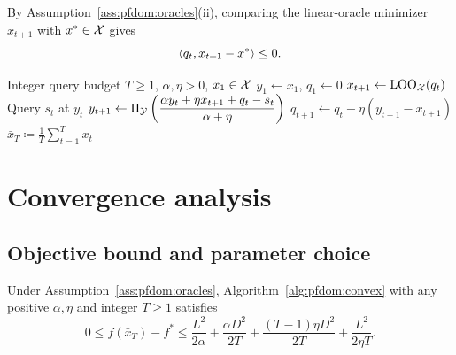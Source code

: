 By Assumption~\ref{ass:pfdom:oracles}(ii), comparing the linear-oracle
minimizer $x_{t+1}$ with $x^*\in\mathcal{X}$ gives
\begin{equation}\label{eq:pfdom:loo-optimality}
    \left\langle q_t,x_{t+1}-x^* \right\rangle\leq0.
\end{equation}

\begin{algorithm}[H]
\caption{Domain separation for a nonsmooth convex objective}
\label{alg:pfdom:convex}
\begin{algorithmic}[1]
\Require Integer query budget $T\geq1$, $\alpha,\eta>0$, $x_1\in\mathcal{X}$
\State $y_1\gets x_1$, $q_1\gets0$
    \State $x_{t+1}\gets\operatorname{LOO}_{\mathcal{X}}(q_t)$
    \State Query $s_t$ at $y_t$
    \State $\displaystyle y_{t+1}\gets\Pi_{\mathcal{Y}}\left(
      \frac{\alpha y_t+\eta x_{t+1}+q_t-s_t}{\alpha+\eta}\right)$
    \State $q_{t+1}\gets q_t-\eta(y_{t+1}-x_{t+1})$
\EndFor
\State \Return $\displaystyle\bar x_T\coloneqq\frac1T\sum_{t=1}^T x_t$
\end{algorithmic}
\end{algorithm}

\section{Convergence analysis}
\label{sec:pfdom:convergence}

\subsection{Objective bound and parameter choice}

\begin{Thm:Theorem}\label{thm:pfdom:convex}
Under Assumption~\ref{ass:pfdom:oracles}, Algorithm~\ref{alg:pfdom:convex}
with any positive $\alpha,\eta$ and integer $T\geq1$ satisfies
\begin{equation}\label{eq:ch2-basic-bound}
    0\leq f(\bar x_T)-f^*
    \leq\frac{L^2}{2\alpha}+\frac{\alpha D^2}{2T}
      +\frac{(T-1)\eta D^2}{2T}
      +\frac{L^2}{2\eta T}.
\end{equation}
\end{Thm:Theorem}

